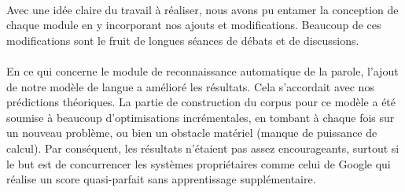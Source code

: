 \paragraph{}
Avec une idée claire du travail à réaliser, nous avons pu entamer la conception de chaque module en y incorporant nos ajouts et modifications. Beaucoup de ces modifications sont le fruit de longues séances de débats et de discussions. 

\paragraph{}
En ce qui concerne le module de reconnaissance automatique de la parole, l'ajout de notre modèle de langue a amélioré les résultats. Cela s'accordait avec nos prédictions théoriques. La partie de construction du corpus pour ce modèle a été soumise à beaucoup d'optimisations incrémentales, en tombant à chaque fois sur un nouveau problème, ou bien un obstacle matériel (manque de puissance de calcul). Par conséquent, les résultats n'étaient pas assez encourageants, surtout si le but est de concurrencer les systèmes propriétaires comme celui de Google qui réalise un score quasi-parfait sans apprentissage supplémentaire.

\paragraph{}


